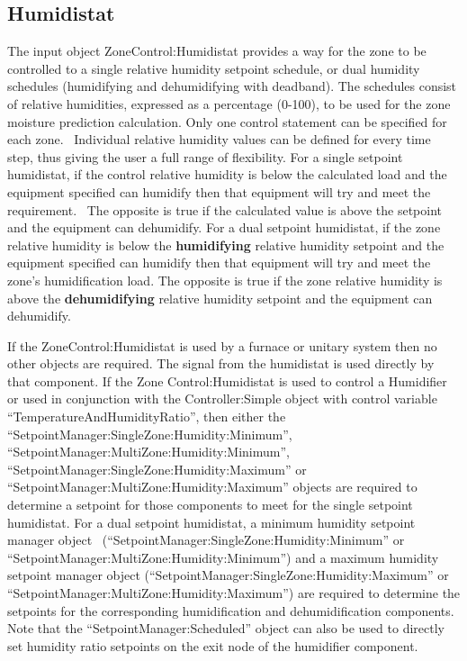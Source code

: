 \subsection{Humidistat}\label{humidistat}

The input object ZoneControl:Humidistat provides a way for the zone to be controlled to a single relative humidity setpoint schedule, or dual humidity schedules (humidifying and dehumidifying with deadband). The schedules consist of relative humidities, expressed as a percentage (0-100), to be used for the zone moisture prediction calculation. Only one control statement can be specified for each zone.~ Individual relative humidity values can be defined for every time step, thus giving the user a full range of flexibility. For a single setpoint humidistat, if the control relative humidity is below the calculated load and the equipment specified can humidify then that equipment will try and meet the requirement.~ The opposite is true if the calculated value is above the setpoint and the equipment can dehumidify. For a dual setpoint humidistat, if the zone relative humidity is below the \textbf{humidifying} relative humidity setpoint and the equipment specified can humidify then that equipment will try and meet the zone's humidification load. The opposite is true if the zone relative humidity is above the \textbf{dehumidifying} relative humidity setpoint and the equipment can dehumidify.

If the ZoneControl:Humidistat is used by a furnace or unitary system then no other objects are required. The signal from the humidistat is used directly by that component. If the Zone Control:Humidistat is used to control a Humidifier or used in conjunction with the Controller:Simple object with control variable ``TemperatureAndHumidityRatio'', then either the ``SetpointManager:SingleZone:Humidity:Minimum'', ``SetpointManager:MultiZone:Humidity:Minimum'',~ ``SetpointManager:SingleZone:Humidity:Maximum'' or ``SetpointManager:MultiZone:Humidity:Maximum'' objects are required to determine a setpoint for those components to meet for the single setpoint humidistat. For a dual setpoint humidistat, a minimum humidity setpoint manager object~ (``SetpointManager:SingleZone:Humidity:Minimum'' or ``SetpointManager:MultiZone:Humidity:Minimum'') and a maximum humidity setpoint manager object (``SetpointManager:SingleZone:Humidity:Maximum'' or ``SetpointManager:MultiZone:Humidity:Maximum'') are required to determine the setpoints for the corresponding humidification and dehumidification components. Note that the ``SetpointManager:Scheduled'' object can also be used to directly set humidity ratio setpoints on the exit node of the humidifier component.

